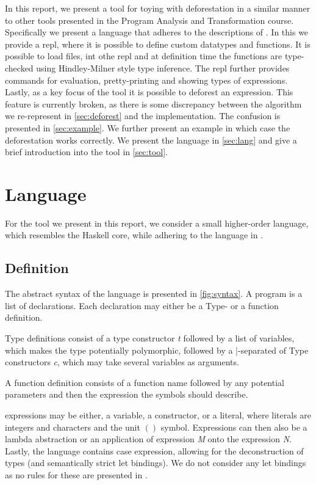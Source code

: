 \documentclass[a4paper, openany]{article}
\begin{document}
In this report, we present a tool for toying with deforestation in a similar manner to other tools presented in the Program Analysis and Transformation course. Specifically we present a language that adheres to the descriptions of \cite{hodeforest}. In this we provide a
repl, where it is possible to define custom datatypes and functions. It is possible to load files, int othe repl and at definition time the functions are type-checked using Hindley-Milner style type inference. The repl further provides commands for evaluation, pretty-printing and showing types of expressions.
Lastly, as a key focus of the tool it is possible to deforest an expression. This feature is currently broken, as there is some discrepancy between the algorithm we re-represent in \autoref{sec:deforest} and the implementation. The confusion is presented in \autoref{sec:example}. We further present an example in which case the deforestation works correctly.
We present the language in \autoref{sec:lang} and give a brief introduction into the tool in \autoref{sec:tool}.

\section{Language}
\label{sec:lang}
For the tool we present in this report, we consider a small higher-order language, which resembles the Haskell core\cite{core}, while adhering to the language in \cite{hodeforest}.

\subsection{Definition}
\label{sec:orge05abe8}
The abstract syntax of the language is presented in \ref{fig:syntax}.
A program is a list of declarations.
Each declaration may either be a Type- or a function definition.

Type definitions consist of a type constructor \emph{t} followed by a list of variables, which makes the type potentially polymorphic,
followed by a |-separated of Type constructors \emph{c}, which may take several variables as arguments.

A function definition consists of a function name followed by any potential parameters and then the expression the symbols should describe.

expressions may be either, a variable, a constructor, or a literal, where literals are integers and characters and the unit \(()\) symbol.
Expressions can then also be a lambda abstraction or an application of expression \emph{M} onto the expression \emph{N}.
Lastly, the language contains case expression, allowing for the deconstruction of types (and semantically strict let bindings).
We do not consider any let bindings as no rules for these are presented in \cite{hodeforest}.
\end{document}

